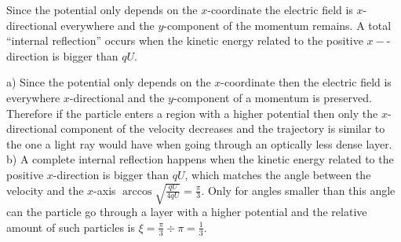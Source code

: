 \hinteng
Since the potential only depends on the $x$-coordinate the electric field is $x$-directional everywhere and the $y$-component of the momentum remains. A total “internal reflection” occurs when the kinetic energy related to the positive $x-$-direction is bigger than $qU$.

\solueng
a) Since the potential only depends on the $x$-coordinate then the electric field is everywhere $x$-directional and the $y$-component of a momentum is preserved. Therefore if the particle enters a region with a higher potential then only the $x$-directional component of the velocity decreases and the trajectory is similar to the one a light ray would have when going through an optically less dense layer.\\
b) A complete internal reflection happens when the kinetic energy related to the positive $x$-direction is bigger than $qU$, which matches the angle between the velocity and the $x$-axis $\arccos \sqrt{\frac {qU}{4qU}}=\frac \pi 3$. Only for angles smaller than this angle can the particle go through a layer with a higher potential and the relative amount of such particles is $\xi = \frac \pi 3 \div \pi = \frac 13$.
\probend